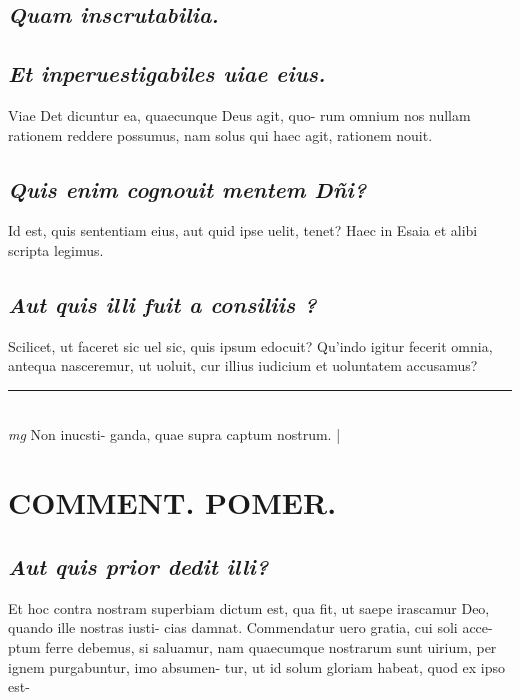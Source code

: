 \documentclass{article}
\begin{document}
\begin{pages}
\subsection*{\textit{Quam inscrutabilia. }}
{}
\subsection*{\textit{Et inperuestigabiles uiae eius. }}\pstart Viae Det dicuntur ea, quaecunque Deus agit, quo- rum omnium nos nullam rationem reddere possumus, nam solus qui haec agit, rationem nouit.   \pend
{}
{}
\subsection*{\textit{Quis enim cognouit mentem Dñi? }}\pstart Id est, quis sententiam eius, aut quid ipse uelit, tenet? Haec in Esaia et alibi scripta legimus.  \pend
{}
{}
\subsection*{\textit{Aut quis illi fuit a consiliis ? }}\pstart Scilicet, ut faceret sic uel sic, quis ipsum edocuit? Qu'indo igitur fecerit omnia, antequa nasceremur, ut uoluit, cur illius iudicium et uoluntatem accusamus?  \pend
\vspace{0.5cm}\noindent
\vspace{0.2cm}\rule{1cm}{0.2pt}\\ 
\hspace{0.2cm}\textit{mg}
\footnotesize Non inucsti- ganda, quae supra captum nostrum.  
\normalsize| 
\section*{COMMENT. POMER.  }
{}
\subsection*{\textit{Aut quis prior dedit illi? }}\pstart Et hoc contra nostram superbiam dictum est, qua fit, ut saepe irascamur Deo, quando ille nostras iusti- cias damnat. Commendatur uero gratia, cui soli acce- ptum ferre debemus, si saluamur, nam quaecumque nostrarum sunt uirium, per ignem purgabuntur, imo absumen- tur, ut id solum gloriam habeat, quod ex ipso est-  \pend
{}
{}

\end{pages}
\end{document}
